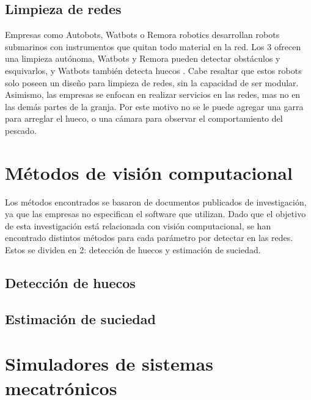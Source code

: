 \subsection{Limpieza de redes}
Empresas como Autobots, Watbots o Remora robotics desarrollan robots submarinos con instrumentos que quitan todo material en la red. Los 3 ofrecen una limpieza autónoma,  Watbots y Remora pueden detectar obstáculos y esquivarlos, y Watbots también detecta huecos \cite{Watbots}. Cabe resaltar que estos robots solo poseen un diseño para limpieza de redes, sin la capacidad de ser modular. Asimismo, las empresas se enfocan en realizar servicios en las redes, mas no en las demás partes de la granja. Por este motivo no se le puede agregar una garra para arreglar el hueco, o una cámara para observar el comportamiento del pescado. 


%

\section{Métodos de visión computacional}
Los métodos encontrados se basaron de documentos publicados de investigación, ya que las empresas no especifican el software que utilizan. Dado que el objetivo de esta investigación está relacionada con visión computacional, se han encontrado distintos métodos para cada parámetro por detectar en las redes. Estos se dividen en 2: detección de huecos y estimación de suciedad.

\subsection{Detección de huecos}



\subsection{Estimación de suciedad}

\section{Simuladores de sistemas mecatrónicos}



